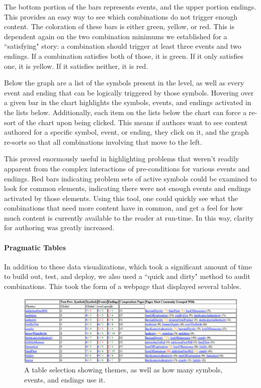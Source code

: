 
The bottom portion of the bars represents events, and the upper portion endings. This provides an easy way to see which combinations do not trigger enough content. The coloration of these bars is either green, yellow, or red. This is dependent again on the two combination minimums we established for a ``satisfying" story: a combination should trigger at least three events and two endings. If a combination satisfies both of those, it is green. If it only satisfies one, it is yellow. If it satisfies neither, it is red.

Below the graph are a list of the symbols present in the level, as well as every event and ending that can be logically triggered by those symbols. Hovering over a given bar in the chart highlights the symbols, events, and endings activated in the lists below. Additionally, each item on the lists below the chart can force a re-sort of the chart upon being clicked. This means if authors want to see content authored for a specific symbol, event, or ending, they click on it, and the graph re-sorts so that all combinations involving that move to the left.

This proved enormously useful in highlighting problems that weren't readily apparent from the complex interactions of pre-conditions for various events and endings. Red bars indicating problem sets of active symbols could be examined to look for common elements, indicating there were not enough events and endings activated by those elements. Using this tool, one could quickly see what the combinations that need more content have in common, and get a feel for how much content is currently available to the reader at run-time. In this way, clarity for authoring was greatly increased.

\paragraph{Pragmatic Tables}\label{par:pragmatic-tables}

In addition to these data visualizations, which took a significant amount of time to build out, test, and deploy, we also used a ``quick and dirty" method to audit combinations. This took the form of a webpage that displayed several tables.


\begin{figure}
    \centering
    \includegraphics[width=\textwidth]{figures/2-Ice-Bound/pragmatic-tables.png}
    \caption{A table selection showing themes, as well as how many symbols, events, and endings use it.}
    \label{fig:prag-tables}
\end{figure}

